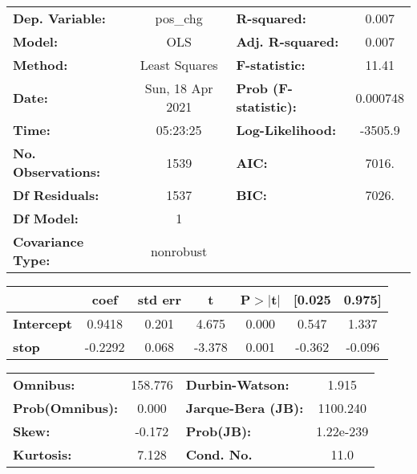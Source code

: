\begin{center}
\begin{tabular}{lclc}
\toprule
\textbf{Dep. Variable:}    &     pos\_chg     & \textbf{  R-squared:         } &    0.007  \\
\textbf{Model:}            &       OLS        & \textbf{  Adj. R-squared:    } &    0.007  \\
\textbf{Method:}           &  Least Squares   & \textbf{  F-statistic:       } &    11.41  \\
\textbf{Date:}             & Sun, 18 Apr 2021 & \textbf{  Prob (F-statistic):} & 0.000748  \\
\textbf{Time:}             &     05:23:25     & \textbf{  Log-Likelihood:    } &  -3505.9  \\
\textbf{No. Observations:} &        1539      & \textbf{  AIC:               } &    7016.  \\
\textbf{Df Residuals:}     &        1537      & \textbf{  BIC:               } &    7026.  \\
\textbf{Df Model:}         &           1      & \textbf{                     } &           \\
\textbf{Covariance Type:}  &    nonrobust     & \textbf{                     } &           \\
\bottomrule
\end{tabular}
\end{center}\begin{center}
\begin{tabular}{lcccccc}
\toprule
                   & \textbf{coef} & \textbf{std err} & \textbf{t} & \textbf{P$> |$t$|$} & \textbf{[0.025} & \textbf{0.975]}  \\
\midrule
\textbf{Intercept} &       0.9418  &        0.201     &     4.675  &         0.000        &        0.547    &        1.337     \\
\textbf{stop}      &      -0.2292  &        0.068     &    -3.378  &         0.001        &       -0.362    &       -0.096     \\
\bottomrule
\end{tabular}
\end{center}\begin{center}
\begin{tabular}{lclc}
\toprule
\textbf{Omnibus:}       & 158.776 & \textbf{  Durbin-Watson:     } &     1.915  \\
\textbf{Prob(Omnibus):} &   0.000 & \textbf{  Jarque-Bera (JB):  } &  1100.240  \\
\textbf{Skew:}          &  -0.172 & \textbf{  Prob(JB):          } & 1.22e-239  \\
\textbf{Kurtosis:}      &   7.128 & \textbf{  Cond. No.          } &      11.0  \\
\bottomrule
\end{tabular}
\end{center}